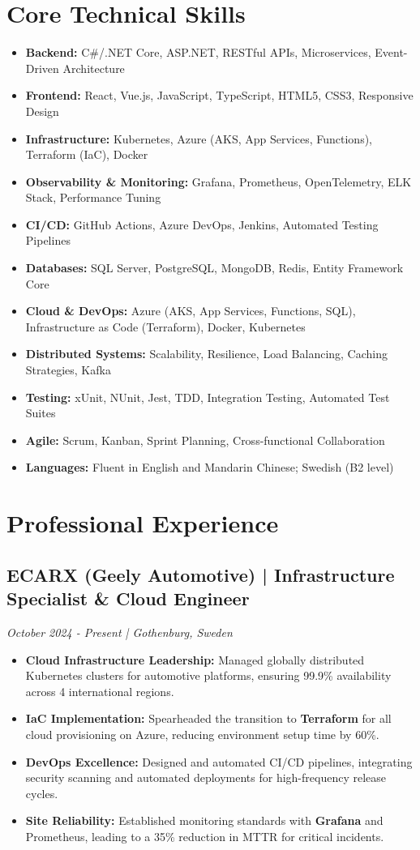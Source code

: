 \documentclass[11pt,a4paper]{article}
\begin{document}
\section*{Core Technical Skills}
\begin{itemize}[noitemsep]
\item \textbf{Backend:} C\#/.NET Core, ASP.NET, RESTful APIs, Microservices, Event-Driven Architecture
\item \textbf{Frontend:} React, Vue.js, JavaScript, TypeScript, HTML5, CSS3, Responsive Design
\item \textbf{Infrastructure:} Kubernetes, Azure (AKS, App Services, Functions), Terraform (IaC), Docker
\item \textbf{Observability \& Monitoring:} Grafana, Prometheus, OpenTelemetry, ELK Stack, Performance Tuning
\item \textbf{CI/CD:} GitHub Actions, Azure DevOps, Jenkins, Automated Testing Pipelines
\item \textbf{Databases:} SQL Server, PostgreSQL, MongoDB, Redis, Entity Framework Core
\item \textbf{Cloud \& DevOps:} Azure (AKS, App Services, Functions, SQL), Infrastructure as Code (Terraform), Docker, Kubernetes
\item \textbf{Distributed Systems:} Scalability, Resilience, Load Balancing, Caching Strategies, Kafka
\item \textbf{Testing:} xUnit, NUnit, Jest, TDD, Integration Testing, Automated Test Suites
\item \textbf{Agile:} Scrum, Kanban, Sprint Planning, Cross-functional Collaboration
\item \textbf{Languages:} Fluent in English and Mandarin Chinese; Swedish (B2 level)
\end{itemize}

\section*{Professional Experience}
\subsection*{ECARX (Geely Automotive) | Infrastructure Specialist \& Cloud Engineer}
\textit{October 2024 - Present | Gothenburg, Sweden}
\begin{itemize}[noitemsep]
\item \textbf{Cloud Infrastructure Leadership:} Managed globally distributed Kubernetes clusters for automotive platforms, ensuring 99.9\% availability across 4 international regions.
\item \textbf{IaC Implementation:} Spearheaded the transition to \textbf{Terraform} for all cloud provisioning on Azure, reducing environment setup time by 60\%.
\item \textbf{DevOps Excellence:} Designed and automated CI/CD pipelines, integrating security scanning and automated deployments for high-frequency release cycles.
\item \textbf{Site Reliability:} Established monitoring standards with \textbf{Grafana} and Prometheus, leading to a 35\% reduction in MTTR for critical incidents.
\end{itemize}
\end{document}
